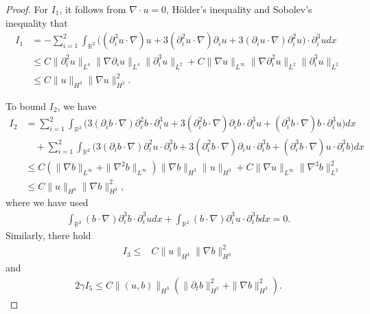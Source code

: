 \documentclass[10pt,a4paper]{amsart}
\def\R{\mathbb R}
\begin{document}
\begin{proof}
\par For $I_1$, it follows from $\nabla\cdot u=0$,
H\"{o}lder's inequality and Sobolev's inequality that
\begin{align}
I_{1}&=-\sum_{i=1}^2\int_{\R^2}\big((\partial_{i}^3u\cdot\nabla) u+3(\partial_{i}^2u\cdot\nabla)\partial_{i} u+3(\partial_{i}u\cdot\nabla)\partial_{i}^2 u\big)\cdot\partial_{i}^3udx\nonumber\\
&\leq C\|\partial_{i}^2u\|_{L^4}\|\nabla\partial_{i}u\|_{L^4}\|\partial_{i}^3u\|_{L^2}+C\|\nabla u\|_{L^{\infty}}\|\nabla\partial_{i}^2u\|_{L^2}\|\partial_{i}^3u\|_{L^2}\nonumber\\
&\leq C\|u\|_{H^{3}}\|\nabla u\|_{H^2}^2.\label{control I1}
\end{align}



To bound $I_2$, we have
\begin{align}
I_{2}&=
\sum_{i=1}^{2}\int_{\R^2}\Big(3(\partial_{i}b\cdot\nabla)\partial_{i}^2b\cdot\partial_{i}^3u+
3(\partial_{i}^2b\cdot\nabla)\partial_{i}b\cdot\partial_{i}^3u
+(\partial_{i}^3b\cdot\nabla) b\cdot\partial_{i}^3u\Big)dx\nonumber\\&\quad+\sum_{i=1}^{2}
\int_{\R^2}\Big(3(\partial_{i}b\cdot\nabla)\partial_{i}^2u\cdot\partial_{i}^3b+
3(\partial_{i}^2b\cdot\nabla)\partial_{i}u\cdot\partial_{i}^3b
+(\partial_{i}^3b\cdot\nabla) u\cdot\partial_{i}^3b\Big)dx\nonumber\\
&\leq C\left(\|\nabla b\|_{L^\infty}+\|\nabla^2 b\|_{L^\infty}\right)\|\nabla b\|_{H^3}\|u\|_{H^3}+C\|\nabla u\|_{L^\infty}\|\nabla^3b\|_{L^2}^2\nonumber\\
&\leq C\|u\|_{H^3}\|\nabla b\|_{H^3}^2,\label{control I2}
\end{align}
where we have used
\begin{align*}
\int_{\R^2}(b\cdot\nabla)\partial_{i}^3 b \cdot\partial_{i}^3udx+\int_{\R^2}(b\cdot\nabla)\partial_{i}^3 u \cdot\partial_{i}^3bdx=0.
\end{align*}
Similarly, there hold
\begin{align}
I_{3}
\leq &C\|u\|_{H^3}\|\nabla b\|_{H^3}^2\label{control I3}
\end{align}
and
\begin{align}
2\gamma I_5\leq C\|(u,b)\|_{H^3}\left(\|\partial_t b\|_{H^3}^2+\|\nabla b\|_{H^3}^2\right).\label{control I5}
\end{align}




\end{proof}
\end{document}
